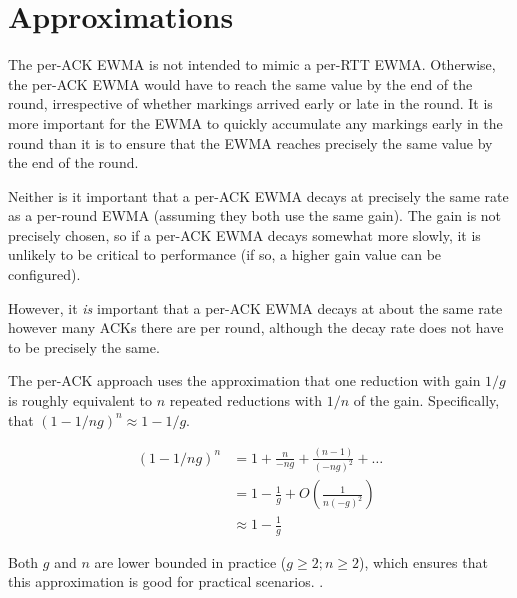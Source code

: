 \section{Approximations}\label{prresp_approx}

\balance
The per-ACK EWMA is not intended to mimic a per-RTT EWMA. Otherwise, the per-ACK EWMA would have to reach the same value by the end of the round, irrespective of whether markings arrived early or late in the round.
It is more important for the EWMA to quickly accumulate any markings early in the round than it is to ensure that the EWMA reaches precisely the same value by the end of the round. 

Neither is it important that a per-ACK EWMA decays at precisely the same rate as a per-round EWMA (assuming they both use the same gain). The gain is not precisely chosen, so if a per-ACK EWMA decays somewhat more slowly, it is unlikely to be critical to performance (if so, a higher gain value can be configured).

However, it \emph{is} important that a per-ACK EWMA decays at about the same rate however many ACKs there are per round, although the decay rate does not have to be precisely the same.

The per-ACK approach uses the approximation that one reduction with gain \(1/g\) is roughly equivalent to \(n\) repeated reductions with \(1/n\) of the gain. Specifically, that \((1 - 1/ng)^n \approx 1 - 1/g\).

\begin{align*}
(1 - 1/ng)^n &=       1 + \frac{n}{-ng} + \frac{(n-1)}{(-ng)^2} + \ldots \\
             &=       1 - \frac{1}{g} + O\left(\frac{1}{n(-g)^2}\right)\\
             &\approx 1 - \frac{1}{g}
\end{align*}

Both \(g\) and \(n\) are lower bounded in practice (\(g\ge2; n\ge2\)), which ensures that this approximation is good for practical scenarios.
.
